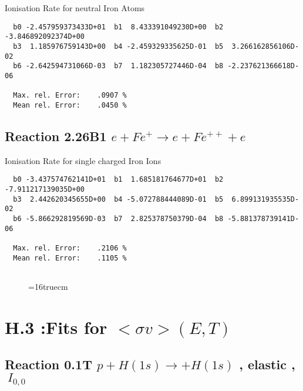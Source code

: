 \documentclass[12pt]{article}
\begin{document}
  Ionisation Rate for neutral Iron Atoms

\begin{small}\begin{verbatim}
  b0 -2.457959373433D+01  b1  8.433391049230D+00  b2 -3.846892092374D+00
  b3  1.185976759143D+00  b4 -2.459329335625D-01  b5  3.266162856106D-02
  b6 -2.642594731066D-03  b7  1.182305727446D-04  b8 -2.237621366618D-06

  Max. rel. Error:    .0907 %
  Mean rel. Error:    .0450 %

\end{verbatim}\end{small}



\subsection{
Reaction 2.26B1   $e + Fe^+ \rightarrow e + Fe^{++} + e$
}

  Ionisation Rate for single charged Iron Ions

\begin{small}\begin{verbatim}
  b0 -3.437574762141D+01  b1  1.685181764677D+01  b2 -7.911217139035D+00
  b3  2.442620345655D+00  b4 -5.072788444089D-01  b5  6.899131935535D-02
  b6 -5.866292819569D-03  b7  2.825378750379D-04  b8 -5.881378739141D-06

  Max. rel. Error:    .2106 %
  Mean rel. Error:    .1105 %


\end{verbatim}\end{small}


\begin{figure} \label{2.26B}
\epsfxsize=16truecm
\end{figure}
\newpage

\section{H.3 :Fits for $<\sigma v> (E,T)$}\label{sect3}


\subsection{
Reaction 0.1T  $p + H(1s) \rightarrow  + H(1s)$
, elastic ,
$\  I_{0,0}$
}
\end{document}
